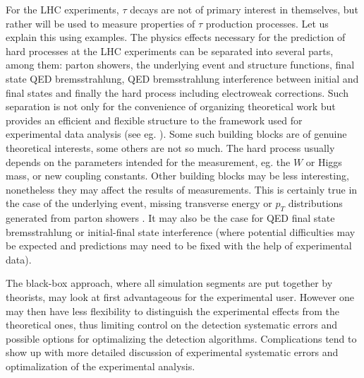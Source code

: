 \documentclass[]{Tauola_interface_design}
\begin{document}
For the LHC experiments, $\tau$ 
decays are not of primary interest in themselves, but rather 
will be  used to measure properties of $\tau$ production processes. 
%
Let us explain this using examples. The physics effects necessary for 
the prediction of hard processes 
at the LHC experiments can be separated into several parts, among them: 
parton showers, 
the underlying event and structure functions, final 
state QED bremsstrahlung, QED bremsstrahlung interference between initial and 
final states and finally the hard process including electroweak corrections. 
Such separation 
is not only for the convenience of organizing theoretical work but 
provides an efficient and flexible
   structure to the framework used for experimental data analysis
 (see eg. \cite{Aad:2009wy}).
Some
such building blocks are of genuine theoretical interests, some others
are not so much. The
 hard process
usually  depends on the parameters intended for the measurement, eg.  
the $W$ or Higgs mass, or new coupling constants. 
Other building blocks may be less interesting, nonetheless they may affect
the results of measurements. This is certainly true in the case of the underlying event,
missing transverse energy or $p_T$ distributions generated from parton 
showers \cite{RichterWas:2004jf}. It may also be the case for QED final
state bremsstrahlung or
initial-final state interference (where potential difficulties may be expected 
\cite{Abdallah:2005wn} and predictions may need to be fixed with the 
help of experimental data). 



The black-box approach, where all simulation segments are put together by
theorists, may look at first advantageous for the experimental user.
However  one may then have less flexibility to distinguish the experimental
effects from the theoretical ones, thus limiting control on the 
detection systematic 
errors and possible options for optimalizing the detection algorithms. 
Complications tend to show up with more 
detailed discussion of experimental systematic errors and optimalization of
the experimental analysis. 

\end{document}
